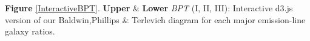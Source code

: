 \label{InteractiveBPT} \textbf{Figure} \ref{InteractiveBPT}. \textbf{Upper} & \textbf{Lower} \textit{BPT} (I, II, III): Interactive d3.js version of our Baldwin,Phillips \& Terlevich diagram for each major emission-line galaxy ratios.